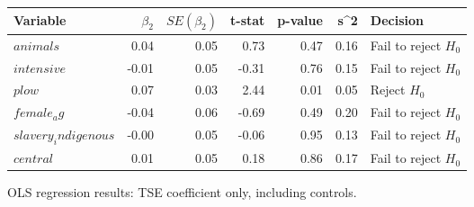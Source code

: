 \centering
\begin{tabular}{lrrrrrl}
\hline
Variable & $\beta_2$ & $SE(\beta_2)$ & t-stat & p-value & s^2 & Decision \\
\hline
$animals$ & 0.04 & 0.05 & 0.73 & 0.47 & 0.16 & Fail to reject $H_0$ \\
$intensive$ & -0.01 & 0.05 & -0.31 & 0.76 & 0.15 & Fail to reject $H_0$ \\
$plow$ & 0.07 & 0.03 & 2.44 & 0.01 & 0.05 & Reject $H_0$ \\
$female_ag$ & -0.04 & 0.06 & -0.69 & 0.49 & 0.20 & Fail to reject $H_0$ \\
$slavery_indigenous$ & -0.00 & 0.05 & -0.06 & 0.95 & 0.13 & Fail to reject $H_0$ \\
$central$ & 0.01 & 0.05 & 0.18 & 0.86 & 0.17 & Fail to reject $H_0$ \\
\hline
\end{tabular}
\caption{OLS regression results: TSE coefficient only, including controls.}
\label{tab:regression_results_TSE}
